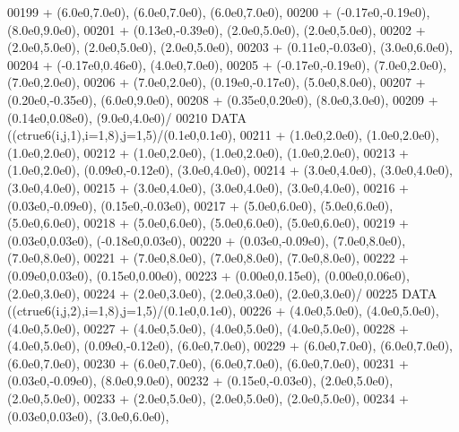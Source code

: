 \begin{DoxyCode}
00199      +                  (6.0e0,7.0e0), (6.0e0,7.0e0), (6.0e0,7.0e0),
00200      +                  (-0.17e0,-0.19e0), (8.0e0,9.0e0),
00201      +                  (0.13e0,-0.39e0), (2.0e0,5.0e0), (2.0e0,5.0e0),
00202      +                  (2.0e0,5.0e0), (2.0e0,5.0e0), (2.0e0,5.0e0),
00203      +                  (0.11e0,-0.03e0), (3.0e0,6.0e0),
00204      +                  (-0.17e0,0.46e0), (4.0e0,7.0e0),
00205      +                  (-0.17e0,-0.19e0), (7.0e0,2.0e0), (7.0e0,2.0e0),
00206      +                  (7.0e0,2.0e0), (0.19e0,-0.17e0), (5.0e0,8.0e0),
00207      +                  (0.20e0,-0.35e0), (6.0e0,9.0e0),
00208      +                  (0.35e0,0.20e0), (8.0e0,3.0e0),
00209      +                  (0.14e0,0.08e0), (9.0e0,4.0e0)/
00210       \textcolor{keyword}{DATA}              ((ctrue6(i,j,1),i=1,8),j=1,5)/(0.1e0,0.1e0),
00211      +                  (1.0e0,2.0e0), (1.0e0,2.0e0), (1.0e0,2.0e0),
00212      +                  (1.0e0,2.0e0), (1.0e0,2.0e0), (1.0e0,2.0e0),
00213      +                  (1.0e0,2.0e0), (0.09e0,-0.12e0), (3.0e0,4.0e0),
00214      +                  (3.0e0,4.0e0), (3.0e0,4.0e0), (3.0e0,4.0e0),
00215      +                  (3.0e0,4.0e0), (3.0e0,4.0e0), (3.0e0,4.0e0),
00216      +                  (0.03e0,-0.09e0), (0.15e0,-0.03e0),
00217      +                  (5.0e0,6.0e0), (5.0e0,6.0e0), (5.0e0,6.0e0),
00218      +                  (5.0e0,6.0e0), (5.0e0,6.0e0), (5.0e0,6.0e0),
00219      +                  (0.03e0,0.03e0), (-0.18e0,0.03e0),
00220      +                  (0.03e0,-0.09e0), (7.0e0,8.0e0), (7.0e0,8.0e0),
00221      +                  (7.0e0,8.0e0), (7.0e0,8.0e0), (7.0e0,8.0e0),
00222      +                  (0.09e0,0.03e0), (0.15e0,0.00e0),
00223      +                  (0.00e0,0.15e0), (0.00e0,0.06e0), (2.0e0,3.0e0),
00224      +                  (2.0e0,3.0e0), (2.0e0,3.0e0), (2.0e0,3.0e0)/
00225       \textcolor{keyword}{DATA}              ((ctrue6(i,j,2),i=1,8),j=1,5)/(0.1e0,0.1e0),
00226      +                  (4.0e0,5.0e0), (4.0e0,5.0e0), (4.0e0,5.0e0),
00227      +                  (4.0e0,5.0e0), (4.0e0,5.0e0), (4.0e0,5.0e0),
00228      +                  (4.0e0,5.0e0), (0.09e0,-0.12e0), (6.0e0,7.0e0),
00229      +                  (6.0e0,7.0e0), (6.0e0,7.0e0), (6.0e0,7.0e0),
00230      +                  (6.0e0,7.0e0), (6.0e0,7.0e0), (6.0e0,7.0e0),
00231      +                  (0.03e0,-0.09e0), (8.0e0,9.0e0),
00232      +                  (0.15e0,-0.03e0), (2.0e0,5.0e0), (2.0e0,5.0e0),
00233      +                  (2.0e0,5.0e0), (2.0e0,5.0e0), (2.0e0,5.0e0),
00234      +                  (0.03e0,0.03e0), (3.0e0,6.0e0),

\end{DoxyCode}
